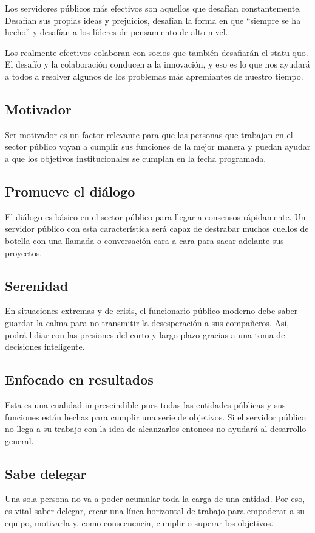 \documentclass[
  a4paper,
]{article}
\begin{document}
Los servidores públicos más efectivos son aquellos que desafían
constantemente. Desafían sus propias ideas y prejuicios, desafían la
forma en que ``siempre se ha hecho'' y desafían a los líderes de
pensamiento de alto nivel.

Los realmente efectivos colaboran con socios que también desafiarán el
statu quo. El desafío y la colaboración conducen a la innovación, y eso
es lo que nos ayudará a todos a resolver algunos de los problemas más
apremiantes de nuestro tiempo.

\subsection{Motivador}\label{motivador}

Ser motivador es un factor relevante para que las personas que trabajan
en el sector público vayan a cumplir sus funciones de la mejor manera y
puedan ayudar a que los objetivos institucionales se cumplan en la fecha
programada.

\subsection{Promueve el diálogo}\label{promueve-el-diuxe1logo}

El diálogo es básico en el sector público para llegar a consensos
rápidamente. Un servidor público con esta característica será capaz de
destrabar muchos cuellos de botella con una llamada o conversación cara
a cara para sacar adelante sus proyectos.

\subsection{Serenidad}\label{serenidad}

En situaciones extremas y de crisis, el funcionario público moderno debe
saber guardar la calma para no transmitir la desesperación a sus
compañeros. Así, podrá lidiar con las presiones del corto y largo plazo
gracias a una toma de decisiones inteligente.

\subsection{Enfocado en resultados}\label{enfocado-en-resultados}

Esta es una cualidad imprescindible pues todas las entidades públicas y
sus funciones están hechas para cumplir una serie de objetivos. Si el
servidor público no llega a su trabajo con la idea de alcanzarlos
entonces no ayudará al desarrollo general.

\subsection{Sabe delegar}\label{sabe-delegar}

Una sola persona no va a poder acumular toda la carga de una entidad.
Por eso, es vital saber delegar, crear una línea horizontal de trabajo
para empoderar a su equipo, motivarla y, como consecuencia, cumplir o
superar los objetivos.


\printbibliography
\end{document}
